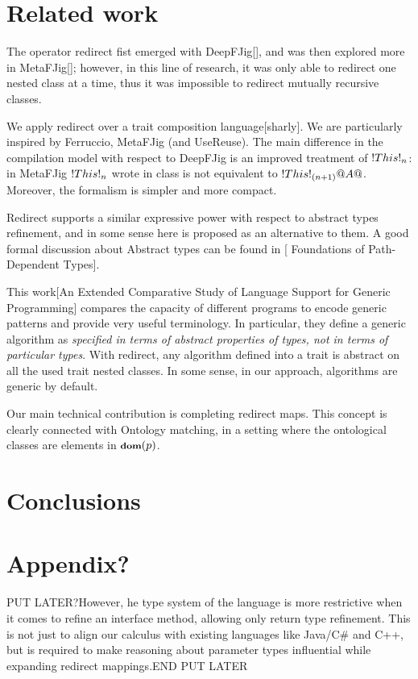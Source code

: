 \renewcommand{\from}[2]{#1\op{from}{#2}}
\section{Related work} 

The operator redirect fist emerged with DeepFJig[],
and was then explored more in MetaFJig[];
however, in this line of research, it was only
able to redirect one nested class at a time, thus it was
impossible to redirect mutually recursive classes.

We apply redirect over a trait composition language[sharly].
We are particularly inspired by Ferruccio, MetaFJig
(and UseReuse).
The main difference in the compilation model with respect to DeepFJig is an improved
treatment of $\This{n}$: in MetaFJig $\This{n}$ wrote in
class \Q@A@ is not equivalent to $\This{(n+1)}{\Q@A@}$.
Moreover, the formalism is simpler and more compact.

Redirect supports a similar expressive power 
with respect to abstract types refinement,
and in some sense here is proposed
as an alternative to them.
A good formal discussion about Abstract types
can be found in [
Foundations of Path-Dependent Types].

This work[An Extended Comparative Study of Language
Support for Generic Programming]
compares the capacity of different programs to encode
generic patterns and provide very useful terminology.
In particular, they define
a generic algorithm as
\emph{specified in terms of abstract properties of types, not in terms of
particular types}.
With redirect, any algorithm defined into a trait
is abstract on all the used trait nested classes. In some sense,
in our approach, algorithms are generic by default.


Our main technical contribution is completing redirect maps.
This concept is clearly connected with
Ontology matching, in a setting where the ontological classes
are elements in ${\footnotesize{\textbf{dom}}({p})}$.

\section{Conclusions} 



\section{Appendix?}

PUT LATER?However, he type system of the language is more restrictive when 
it comes to refine an interface method, allowing only return type refinement. This is not just to align our calculus with existing languages like Java/C\# and C++, but is required to make reasoning about parameter types influential while expanding redirect mappings.END PUT LATER

